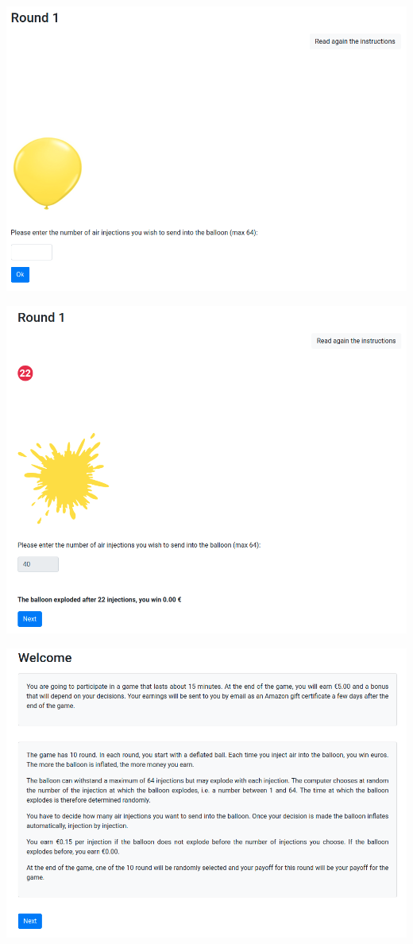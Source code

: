 \documentclass[
]{book}
\begin{document}
\includegraphics[width=0.9\linewidth]{annexe_file/pump_decision}

\includegraphics[width=0.9\linewidth]{annexe_file/pump_explosion}

\includegraphics[width=0.9\linewidth]{annexe_file/pump_instructions}
\end{document}
